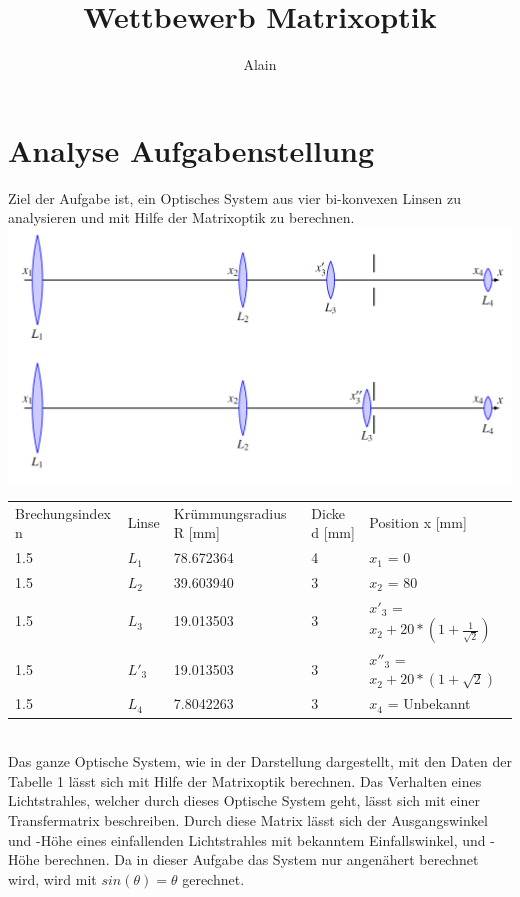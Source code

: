 \documentclass[11pt,twoside,a4paper]{article}
\title{Wettbewerb Matrixoptik}
\author{Alain}
\begin{document}
	\maketitle
	\section{Analyse Aufgabenstellung}
	Ziel der Aufgabe ist, ein Optisches System aus vier bi-konvexen Linsen zu analysieren und mit Hilfe der Matrixoptik zu berechnen. \\
	\includegraphics[scale=.25]{./system.PNG}
	\begin{table}
		\centering
		\begin{tabular}{lllll}
			Brechungsindex n & Linse & Krümmungsradius R [mm]& Dicke d [mm] & Position x [mm] \\
			1.5 & \(L_{1}\) & 78.672364 & 4 & \(x_{1}\) = 0 \\
			1.5 & \(L_{2}\) & 39.603940 & 3 & \(x_{2}\) = 80 \\
			1.5 & \(L_{3}\) & 19.013503 & 3 & \(x'_{3}\) = \(x_{2} + 20 * (1+\frac{1}{\sqrt{2}})\)  \\
			1.5 & \(L'_{3}\) & 19.013503 & 3 & \(x''_{3}\) = \(x_{2} + 20 * (1+\sqrt{2})\) \\
			1.5 & \(L_{4}\) & 7.8042263 & 3 & \(x_{4}\) = Unbekannt \\
		\end{tabular}
	\end{table} \\
	Das ganze Optische System, wie in der Darstellung dargestellt, mit den Daten der Tabelle 1 lässt sich mit Hilfe der Matrixoptik berechnen. Das Verhalten eines Lichtstrahles, welcher durch dieses Optische System geht, lässt sich mit einer Transfermatrix beschreiben. Durch diese Matrix lässt sich der Ausgangswinkel und -Höhe eines einfallenden Lichtstrahles mit bekanntem Einfallswinkel, und -Höhe berechnen. Da in dieser Aufgabe das System nur angenähert berechnet wird, wird mit \(sin(\theta) = \theta\) gerechnet.
\end{document}
